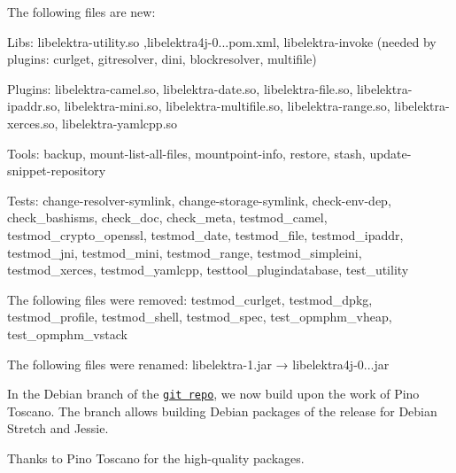 The following files are new\+:


\begin{DoxyItemize}
\item Libs\+: {\ttfamily libelektra-\/utility.\+so} ,{\ttfamily libelektra4j-\/0...\+pom.\+xml}, {\ttfamily libelektra-\/invoke} (needed by plugins\+: curlget, gitresolver, dini, blockresolver, multifile)
\item Plugins\+: {\ttfamily libelektra-\/camel.\+so}, {\ttfamily libelektra-\/date.\+so}, {\ttfamily libelektra-\/file.\+so}, {\ttfamily libelektra-\/ipaddr.\+so}, {\ttfamily libelektra-\/mini.\+so}, {\ttfamily libelektra-\/multifile.\+so}, {\ttfamily libelektra-\/range.\+so}, {\ttfamily libelektra-\/xerces.\+so}, {\ttfamily libelektra-\/yamlcpp.\+so}
\item Tools\+: {\ttfamily backup}, {\ttfamily mount-\/list-\/all-\/files}, {\ttfamily mountpoint-\/info}, {\ttfamily restore}, {\ttfamily stash}, {\ttfamily update-\/snippet-\/repository}
\item Tests\+: {\ttfamily change-\/resolver-\/symlink}, {\ttfamily change-\/storage-\/symlink}, {\ttfamily check-\/env-\/dep}, {\ttfamily check\+\_\+bashisms}, {\ttfamily check\+\_\+doc}, {\ttfamily check\+\_\+meta}, {\ttfamily testmod\+\_\+camel}, {\ttfamily testmod\+\_\+crypto\+\_\+openssl}, {\ttfamily testmod\+\_\+date}, {\ttfamily testmod\+\_\+file}, {\ttfamily testmod\+\_\+ipaddr}, {\ttfamily testmod\+\_\+jni}, {\ttfamily testmod\+\_\+mini}, {\ttfamily testmod\+\_\+range}, {\ttfamily testmod\+\_\+simpleini}, {\ttfamily testmod\+\_\+xerces}, {\ttfamily testmod\+\_\+yamlcpp}, {\ttfamily testtool\+\_\+plugindatabase}, {\ttfamily test\+\_\+utility}
\end{DoxyItemize}

The following files were removed\+: {\ttfamily testmod\+\_\+curlget}, {\ttfamily testmod\+\_\+dpkg}, {\ttfamily testmod\+\_\+profile}, {\ttfamily testmod\+\_\+shell}, {\ttfamily testmod\+\_\+spec}, {\ttfamily test\+\_\+opmphm\+\_\+vheap}, {\ttfamily test\+\_\+opmphm\+\_\+vstack}

The following files were renamed\+: {\ttfamily libelektra-\/1.\+jar} → {\ttfamily libelektra4j-\/0...\+jar}

In the Debian branch of the \href{https://git.libelektra.org/tree/debian}{\tt git repo}, we now build upon the work of Pino Toscano. The branch allows building Debian packages of the release for Debian Stretch and Jessie.

Thanks to Pino Toscano for the high-\/quality packages.

